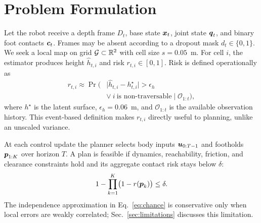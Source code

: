 \section{Problem Formulation}

Let the robot receive a depth frame $D_t$, base state $\boldsymbol{x}_t$, joint state
$\boldsymbol{q}_t$, and binary foot contacts $\boldsymbol{c}_t$. Frames may be absent according to a
dropout mask $d_t\in\{0,1\}$. We seek a local map on grid
$\mathcal{G}\subset\mathbb{R}^2$ with cell size $s=0.05$~m. For cell $i$, the estimator produces
height $\hat h_{t,i}$ and risk $r_{t,i}\in[0,1]$. Risk is defined operationally as
\begin{equation}
\begin{aligned}
 r_{t,i}\approx\Pr\!\bigl(&\lvert \hat h_{t,i}-h^{\star}_{t,i}\rvert>\epsilon_h
 \\[-2pt]
 &\lor\ i\ \text{is non-traversable}\mid\mathcal{O}_{1:t}\bigr),
\end{aligned}
 \label{eq:risk}
\end{equation}
where $h^{\star}$ is the latent surface, $\epsilon_h=0.06$~m, and
$\mathcal{O}_{1:t}$ is the available observation history. This event-based definition makes
$r_{t,i}$ directly useful to planning, unlike an unscaled variance.

At each control update the planner selects body inputs $\boldsymbol{u}_{0:T-1}$ and footholds
$\boldsymbol{p}_{1:K}$ over horizon $T$. A plan is feasible if dynamics, reachability, friction,
and clearance constraints hold and its aggregate contact risk stays below $\delta$:
\begin{equation}
 1-\prod_{k=1}^{K}\bigl(1-r(\boldsymbol{p}_k)\bigr) \leq \delta.
 \label{eq:chance}
\end{equation}
The independence approximation in Eq.~\eqref{eq:chance} is conservative only when local
errors are weakly correlated; Sec.~\ref{sec:limitations} discusses this limitation.
